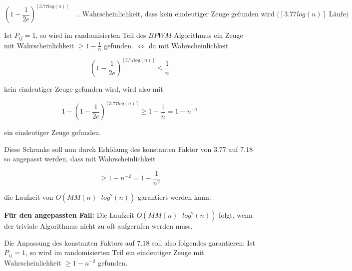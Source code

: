 \documentclass{article}
\begin{document}
\begin{equation}
  \left( 1 - \frac{1}{2e} \right)^{\left\lceil 3.77log(n) \right\rceil} \quad
    \text{\ldots Wahrscheinlichkeit, dass kein eindeutiger Zeuge gefunden wird
    ($\left\lceil 3.77log(n) \right\rceil$ L{\"a}ufe)}
\end{equation}

Ist $P_{ij} = 1$, so wird im randomisierten Teil des $BPWM$-Algorithmus ein Zeuge
mit Wahrscheinlichkeit $\geq 1 - \frac{1}{n}$ gefunden.
$\Longleftrightarrow$ da mit Wahrscheinlichkeit

\begin{equation}
  \left( 1 - \frac{1}{2e} \right)^{\left\lceil 3.77log(n) \right\rceil} \leq \frac{1}{n}
\end{equation}

kein eindeutiger Zeuge gefunden wird, wird also mit

\begin{equation}
  1 - \left( 1 - \frac{1}{2e} \right)^{\left\lceil 3.77log(n) \right\rceil} \geq 1 - \frac{1}{n} = 1 - n^{-1}
\end{equation}

ein eindeutiger Zeuge gefunden.

Diese Schranke soll nun durch Erh{\"o}hung des konstanten Faktor von $3.77$ auf
$7.18$ so angepasst werden, dass mit Wahrscheinlichkeit

\begin{equation}
  \geq 1 - n^{-2} = 1 - \frac{1}{n^2}
\end{equation}

die Laufzeit von $O \left( MM \left( n \right) \cdot log^2(n) \right)$ garantiert
werden kann.

{\bfseries F{\"u}r den angepassten Fall:} \newline
Die Laufzeit $O \left( MM \left( n \right) \cdot log^2(n) \right)$ folgt, wenn
der triviale Algorithmus nicht zu oft aufgerufen werden muss.

Die Anpassung des konstanten Faktors auf $7.18$ soll also folgendes garantieren:
\newline
Ist $P_{ij} = 1$, so wird im randomisierten Teil ein eindeutiger Zeuge mit
Wahrscheinlichkeit $\geq 1 - n^{-2}$ gefunden.
\end{document}
